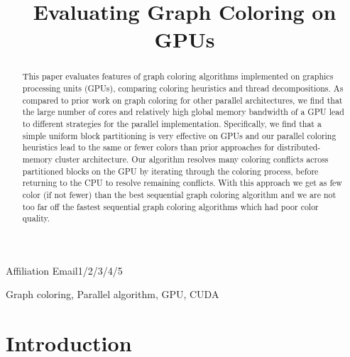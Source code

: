 \documentclass[preprint]{sigplanconf}
\begin{document}
\copyrightdata{[to be supplied]}


\title{Evaluating Graph Coloring on GPUs}

           {Affiliation}
           {Email1/2/3/4/5}

\maketitle

\begin{abstract}
This paper evaluates features of graph coloring algorithms implemented on graphics processing units (GPUs), comparing coloring heuristics and thread decompositions.  As compared to prior work on graph coloring for other parallel architectures, we find that the large number of cores and relatively high global memory bandwidth of a GPU lead to different strategies for the parallel implementation.  Specifically, we find that a simple uniform block partitioning is very effective on GPUs and our parallel coloring heuristics lead to the same or fewer colors than prior approaches for distributed-memory cluster architecture. Our algorithm resolves many coloring conflicts across partitioned blocks on the GPU by iterating through the coloring process, before returning to the CPU to resolve remaining conflicts. With this approach we get as few color (if not fewer) than the best sequential graph coloring algorithm and we are not too far off the fastest sequential graph coloring algorithms which had poor color quality.


\end{abstract}



\keywords
Graph coloring, Parallel algorithm, GPU, CUDA

\section{Introduction}
\end{document}

